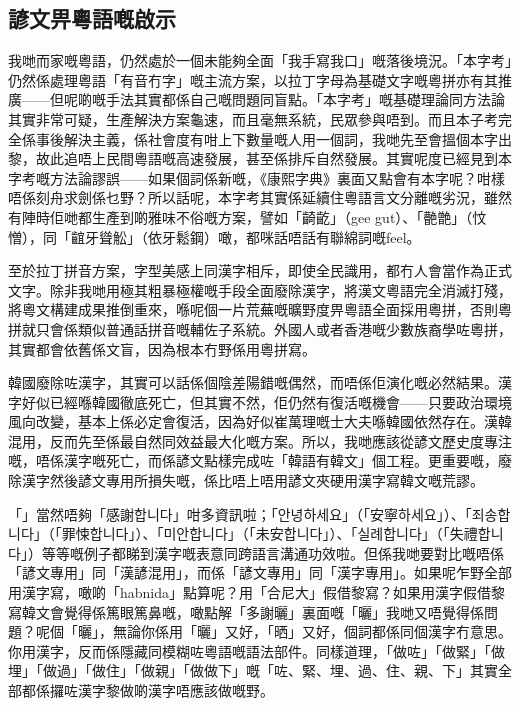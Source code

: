 \subsection*{諺文畀粵語嘅啟示}

我哋而家嘅粵語，仍然處於一個未能夠全面「我手寫我口」嘅落後境況。「本字考」仍然係處理粵語「有音冇字」嘅主流方案，以拉丁字母為基礎文字嘅粵拼亦有其推廣——但呢啲嘅手法其實都係自己嘅問題同盲點。「本字考」嘅基礎理論同方法論其實非常可疑，生產解決方案龜速，而且毫無系統，民眾參與唔到。而且本子考完全係事後解決主義，係社會度有咁上下數量嘅人用一個詞，我哋先至會搵個本字出黎，故此追唔上民間粵語嘅高速發展，甚至係排斥自然發展。其實呢度已經見到本字考嘅方法論謬誤——如果個詞係新嘅，《康熙字典》裏面又點會有本字呢？咁樣唔係刻舟求劍係乜野？所以話呢，本字考其實係延續住粵語言文分離嘅劣況，雖然有陣時佢哋都生產到啲雅味不俗嘅方案，譬如「齮齕」（gee
gut）、「䒐䒏」（忟憎），同「𪘲牙聳䚗」（依牙鬆鋼）噉，都咪話唔話有聯綿詞嘅feel。


至於拉丁拼音方案，字型美感上同漢字相斥，即使全民識用，都冇人會當作為正式文字。除非我哋用極其粗暴極權嘅手段全面廢除漢字，將漢文粵語完全消滅打殘，將粵文構建成果推倒重來，喺呢個一片荒蕪嘅曠野度畀粵語全面採用粵拼，否則粵拼就只會係類似普通話拼音嘅輔佐子系統。外國人或者香港嘅少數族裔學咗粵拼，其實都會依舊係文盲，因為根本冇野係用粵拼寫。

韓國廢除咗漢字，其實可以話係個陰差陽錯嘅偶然，而唔係佢演化嘅必然結果。漢字好似已經喺韓國徹底死亡，但其實不然，佢仍然有復活嘅機會——只要政治環境風向改變，基本上係必定會復活，因為好似崔萬理嘅士大夫喺韓國依然存在。漢韓混用，反而先至係最自然同效益最大化嘅方案。所以，我哋應該從諺文歷史度專注嘅，唔係漢字嘅死亡，而係諺文點樣完成咗「韓語有韓文」個工程。更重要嘅，廢除漢字然後諺文專用所損失嘅，係比唔上唔用諺文夾硬用漢字寫韓文嘅荒謬。

「{\koreanfont {}}」當然唔夠「感謝{\koreanfont 합니다}」咁多資訊啦；「{\koreanfont 안녕하세요}」（「安寧{\koreanfont  하세요}」）、「{\koreanfont  죄송합니다}」（「罪悚{\koreanfont 합니다}」）、「{\koreanfont 미안합니다}」（「未安{\koreanfont 합니다}」）、「{\koreanfont  실례합니다}」（「失禮{\koreanfont 합니다}」）等等嘅例子都睇到漢字嘅表意同跨語言溝通功效啦。但係我哋要對比嘅唔係「諺文專用」同「漢諺混用」，而係「諺文專用」同「漢字專用」。如果呢乍野全部用漢字寫，噉啲「habnida」點算呢？用「合尼大」假借黎寫？如果用漢字假借黎寫韓文會覺得係篤眼篤鼻嘅，噉點解「多謝曬」裏面嘅「曬」我哋又唔覺得係問題？呢個「曬」，無論你係用「曬」又好，「晒」又好，個詞都係同個漢字冇意思。你用漢字，反而係隱藏同模糊咗粵語嘅語法部件。同樣道理，「做咗」「做緊」「做埋」「做過」「做住」「做親」「做做下」嘅「咗、緊、埋、過、住、親、下」其實全部都係攞咗漢字黎做啲漢字唔應該做嘅野。

